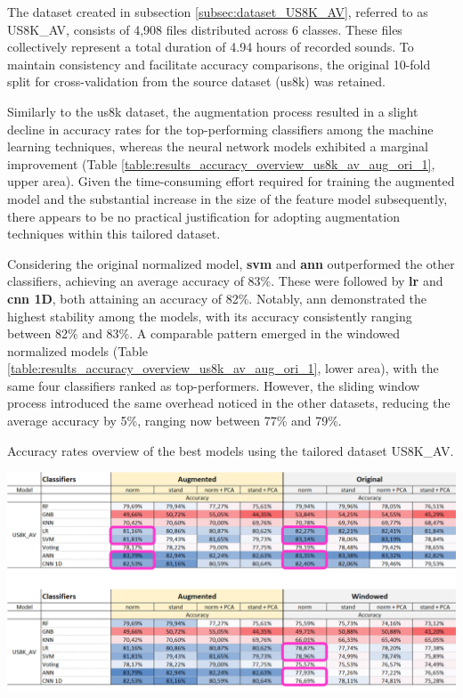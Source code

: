 
The dataset created in subsection \ref{subsec:dataset_US8K_AV}, referred to as US8K\_AV, consists of 4,908 files distributed across 6 classes. These files collectively represent a total duration of 4.94 hours of recorded sounds. To maintain consistency and facilitate accuracy comparisons, the original 10-fold split for cross-validation from the source dataset (\gls{us8k}) was retained.

Similarly to the \gls{us8k} dataset, the augmentation process resulted in a slight decline in accuracy rates for the top-performing classifiers among the machine learning techniques, whereas the neural network models exhibited a marginal improvement (Table \ref{table:results_accuracy_overview_us8k_av_aug_ori_1}, upper area). Given the time-consuming effort required for training the augmented model and the substantial increase in the size of the feature model subsequently, there appears to be no practical justification for adopting augmentation techniques within this tailored dataset.

Considering the original normalized model, \textbf{\gls{svm}} and \textbf{\gls{ann}} outperformed the other classifiers, achieving an average accuracy of 83\%. These were followed by \textbf{\gls{lr}} and \textbf{\gls{cnn} 1D}, both attaining an accuracy of 82\%. Notably, \gls{ann} demonstrated the highest stability among the models, with its accuracy consistently ranging between 82\% and 83\%. A comparable pattern emerged in the windowed normalized models (Table \ref{table:results_accuracy_overview_us8k_av_aug_ori_1}, lower area), with the same four classifiers ranked as top-performers. However, the sliding window process introduced the same overhead noticed in the other datasets, reducing the average accuracy by 5\%, ranging now between 77\% and 79\%.

\begin{table}[ht!]
    \caption[Accuracy rates overview using the tailored dataset US8K\_AV.]{Accuracy rates overview of the best models using the tailored dataset US8K\_AV.}
    \label{table:results_accuracy_overview_us8k_av_aug_ori_1}
     \raggedright
    \includegraphics[width=1\textwidth]{resources/images/060-results/Results_classification_overview_us8k_av_aug_x_ori_1.png}
\end{table}

